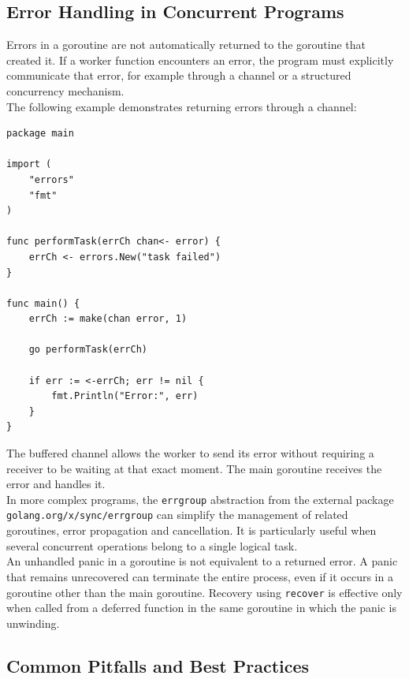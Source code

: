 \subsection{Error Handling in Concurrent Programs}

Errors in a goroutine are not automatically returned to the goroutine that created it. If a worker function encounters an error, the program must explicitly communicate that error, for example through a channel or a structured concurrency mechanism.\\

The following example demonstrates returning errors through a channel:

\begin{lstlisting}
package main

import (
    "errors"
    "fmt"
)

func performTask(errCh chan<- error) {
    errCh <- errors.New("task failed")
}

func main() {
    errCh := make(chan error, 1)

    go performTask(errCh)

    if err := <-errCh; err != nil {
        fmt.Println("Error:", err)
    }
}
\end{lstlisting}

The buffered channel allows the worker to send its error without requiring a receiver to be waiting at that exact moment. The main goroutine receives the error and handles it.\\

In more complex programs, the \texttt{errgroup} abstraction from the external package \texttt{golang.org/x/sync/errgroup} can simplify the management of related goroutines, error propagation and cancellation. It is particularly useful when several concurrent operations belong to a single logical task.\\

An unhandled panic in a goroutine is not equivalent to a returned error. A panic that remains unrecovered can terminate the entire process, even if it occurs in a goroutine other than the main goroutine. Recovery using \texttt{recover} is effective only when called from a deferred function in the same goroutine in which the panic is unwinding.\\

\subsection{Common Pitfalls and Best Practices}

